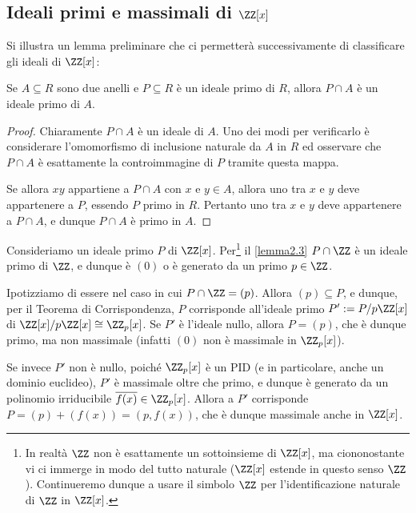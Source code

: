 \documentclass[11pt]{scrartcl}
\begin{document}
	\newpage
	
	\subsection{Ideali primi e massimali di $\ZZ[x]$}
	
	Si illustra un lemma preliminare che ci permetterà successivamente
	di classificare gli ideali di $\ZZ[x]$:
	
	\begin{lemma}
		\label{lemma2.3}
		Se $A \subseteq R$ sono due anelli e $P \subseteq R$ è un ideale primo
		di $R$, allora $P\cap A$ è un ideale primo di $A$.
	\end{lemma}
	
	\begin{proof}
		Chiaramente $P \cap A$ è un ideale di $A$. Uno dei modi per verificarlo è
		considerare l'omomorfismo di inclusione naturale da $A$ in $R$ ed osservare
		che $P \cap A$ è esattamente la controimmagine di $P$ tramite questa
		mappa. \medskip
		

		Se allora $xy$ appartiene a $P \cap A$ con $x$ e $y \in A$, allora
		uno tra $x$ e $y$ deve appartenere a $P$, essendo $P$ primo in
		$R$. Pertanto uno tra $x$ e $y$ deve appartenere a $P \cap A$, e dunque
		$P \cap A$ è primo in $A$.
	\end{proof}
	
	
	Consideriamo un ideale primo $P$ di $\ZZ[x]$. Per\footnote{
		In realtà $\ZZ$ non è esattamente un sottoinsieme di $\ZZ[x]$,
		ma ciononostante vi ci immerge in modo del tutto naturale
		($\ZZ[x]$ estende in questo senso $\ZZ$). Continueremo dunque
		a usare il simbolo $\ZZ$ per l'identificazione naturale di $\ZZ$
		in $\ZZ[x]$.
	} il \autoref{lemma2.3}
	$P \cap \ZZ$ è un ideale primo di $\ZZ$, e dunque è $(0)$ o è generato
	da un primo $p \in \ZZ$. \medskip
	
	
	Ipotizziamo di essere nel caso in cui $P \cap \ZZ = (p)$. Allora $(p) \subseteq P$,
	e dunque, per il Teorema di Corrispondenza, $P$ corrisponde all'ideale primo $P' := P/p\ZZ[x]$
	di $\ZZ[x]/p\ZZ[x] \cong \ZZ_p[x]$. Se $P'$ è l'ideale nullo, allora $P = (p)$,
	che è dunque primo, ma non massimale (infatti $(0)$ non è massimale in $\ZZ_p[x]$). \medskip
	
	Se invece $P'$ non è nullo,
	poiché $\ZZ_p[x]$ è un PID (e in particolare,
	anche un dominio euclideo), $P'$ è massimale oltre che primo, e dunque è generato da un polinomio
	irriducibile $\overline{f(x)} \in \ZZ_p[x]$. Allora a $P'$ corrisponde
	$P = (p) + (f(x)) = (p, f(x))$, che è dunque massimale anche in $\ZZ[x]$. \medskip
	
\end{document}
